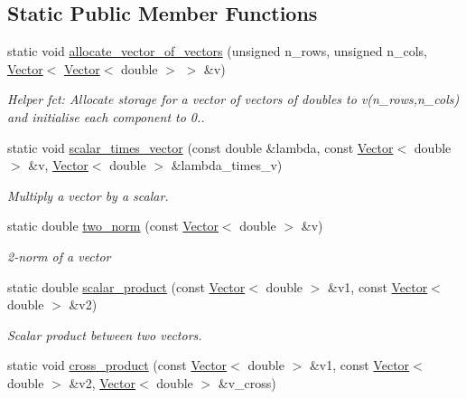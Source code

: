 \subsection*{Static Public Member Functions}
\begin{DoxyCompactItemize}
\item 
static void \hyperlink{classoomph_1_1YoungLaplaceEquations_a3a618a00109c733bc38eee0623386d2b}{allocate\+\_\+vector\+\_\+of\+\_\+vectors} (unsigned n\+\_\+rows, unsigned n\+\_\+cols, \hyperlink{classoomph_1_1Vector}{Vector}$<$ \hyperlink{classoomph_1_1Vector}{Vector}$<$ double $>$ $>$ \&v)
\begin{DoxyCompactList}\small\item\em Helper fct\+: Allocate storage for a vector of vectors of doubles to v(n\+\_\+rows,n\+\_\+cols) and initialise each component to 0.. \end{DoxyCompactList}\item 
static void \hyperlink{classoomph_1_1YoungLaplaceEquations_a1df29bef40248ef56647ce5af2695ca5}{scalar\+\_\+times\+\_\+vector} (const double \&lambda, const \hyperlink{classoomph_1_1Vector}{Vector}$<$ double $>$ \&v, \hyperlink{classoomph_1_1Vector}{Vector}$<$ double $>$ \&lambda\+\_\+times\+\_\+v)
\begin{DoxyCompactList}\small\item\em Multiply a vector by a scalar. \end{DoxyCompactList}\item 
static double \hyperlink{classoomph_1_1YoungLaplaceEquations_a16a1e5407993539ac48a690215ebd13e}{two\+\_\+norm} (const \hyperlink{classoomph_1_1Vector}{Vector}$<$ double $>$ \&v)
\begin{DoxyCompactList}\small\item\em 2-\/norm of a vector \end{DoxyCompactList}\item 
static double \hyperlink{classoomph_1_1YoungLaplaceEquations_a377068e0e409cd58e4af567bdc4dc68b}{scalar\+\_\+product} (const \hyperlink{classoomph_1_1Vector}{Vector}$<$ double $>$ \&v1, const \hyperlink{classoomph_1_1Vector}{Vector}$<$ double $>$ \&v2)
\begin{DoxyCompactList}\small\item\em Scalar product between two vectors. \end{DoxyCompactList}\item 
static void \hyperlink{classoomph_1_1YoungLaplaceEquations_abca184b7f327333dc4284096d94e4771}{cross\+\_\+product} (const \hyperlink{classoomph_1_1Vector}{Vector}$<$ double $>$ \&v1, const \hyperlink{classoomph_1_1Vector}{Vector}$<$ double $>$ \&v2, \hyperlink{classoomph_1_1Vector}{Vector}$<$ double $>$ \&v\+\_\+cross)

\end{DoxyCompactItemize}
